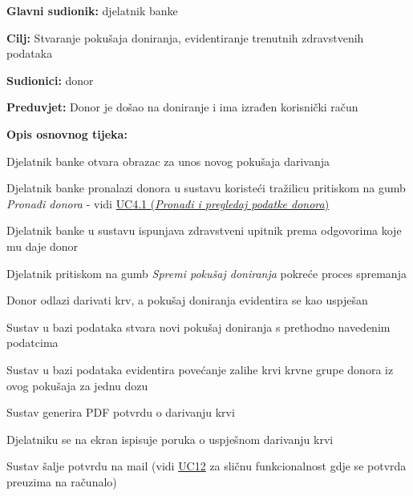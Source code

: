 					
					\noindent {}
					\begin{packed_item} \label{UC6}
	
						\item \textbf{Glavni sudionik: }djelatnik banke
						\item  \textbf{Cilj:} Stvaranje pokušaja doniranja, evidentiranje trenutnih zdravstvenih podataka
						\item  \textbf{Sudionici:} donor
						\item  \textbf{Preduvjet:} Donor je došao na doniranje i ima izrađen korisnički račun 
						\item  \textbf{Opis osnovnog tijeka:}
						
						\item[] \begin{packed_enum}
	
							\item Djelatnik banke otvara obrazac za unos novog pokušaja darivanja
							\item Djelatnik banke pronalazi donora u sustavu koristeći tražilicu pritiskom na gumb \textit{Pronađi donora} - vidi \hyperref[UC4.1]{UC4.1 (\textit{Pronađi i pregledaj podatke donora})}
							\item Djelatnik banke u sustavu ispunjava zdravstveni upitnik prema odgovorima koje mu daje donor
	                        \item Djelatnik pritiskom na gumb \textit{Spremi pokušaj doniranja} pokreće proces spremanja
	                        \item Donor odlazi darivati krv, a pokušaj doniranja evidentira se kao uspješan
	                        \item Sustav u bazi podataka stvara novi pokušaj doniranja s prethodno navedenim podatcima
	                        \item Sustav u bazi podataka evidentira povećanje zalihe krvi krvne grupe donora iz ovog pokušaja za jednu dozu
	                        \item Sustav generira PDF potvrdu o darivanju krvi
	                        \item Djelatniku se na ekran ispisuje poruka o uspješnom darivanju krvi
	                        \item Sustav šalje potvrdu na mail (vidi \hyperref[UC12]{UC12} za sličnu funkcionalnost gdje se potvrda preuzima na računalo)

						\end{packed_enum}
						

\end{packed_item}
